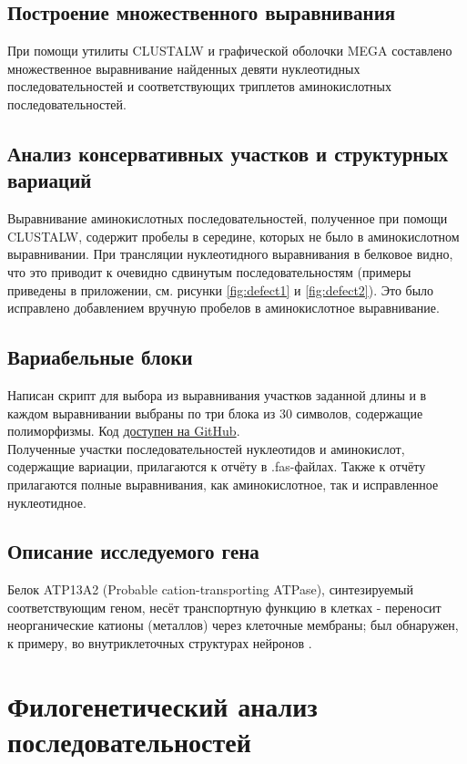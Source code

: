 \documentclass[a4paper,12pt]{article} %
\begin{document}
	\subsection{Построение множественного выравнивания}
	При помощи утилиты CLUSTALW и графической оболочки MEGA составлено множественное выравнивание найденных девяти нуклеотидных последовательностей и соответствующих триплетов аминокислотных последовательностей.
	\subsection{Анализ консервативных участков и структурных вариаций}
	\label{section:fix}
	Выравнивание аминокислотных последовательностей, полученное при помощи CLUSTALW, содержит пробелы в середине, которых не было в аминокислотном выравнивании. При трансляции нуклеотидного выравнивания в белковое видно, что это приводит к очевидно сдвинутым последовательностям (примеры приведены в приложении, см. рисунки \ref{fig:defect1} и \ref{fig:defect2}). Это было исправлено добавлением вручную пробелов в аминокислотное выравнивание.
	
	\subsection{Вариабельные блоки}
	\label{section:variable}
	Написан скрипт для выбора из выравнивания участков заданной длины и в каждом выравнивании выбраны по три блока из 30 символов, содержащие полиморфизмы. Код \href{https://github.com/zuevval/source/blob/master/python/bioinf_practice/needles/random_subalignment.py}{доступен на GitHub}.\\
	Полученные участки последовательностей нуклеотидов и аминокислот, содержащие вариации, прилагаются к отчёту в .fas-файлах. Также к отчёту прилагаются полные выравнивания, как аминокислотное, так и исправленное нуклеотидное.
	\subsection{Описание исследуемого гена}
	Белок ATP13A2 (Probable cation-transporting ATPase), синтезируемый соответствующим геном, несёт транспортную функцию в клетках - переносит неорганические катионы (металлов) через клеточные мембраны; был обнаружен, к примеру, во внутриклеточных структурах нейронов \cite{omim}.
	
	\newpage
	\section{Филогенетический анализ последовательностей}
\end{document}
